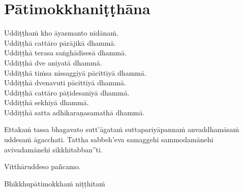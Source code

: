 \section{Pātimokkhaniṭṭhāna}
\label{patimokkhanitthana}

Uddiṭṭhaṁ kho āyasmanto nidānaṁ.\\
Uddiṭṭhā cattāro pārājikā dhammā.\\
Uddiṭṭhā terasa saṅghādisesā dhammā.\\
Uddiṭṭhā dve aniyatā dhammā.\\
Uddiṭṭhā tiṁsa nissaggiyā pācittiyā dhammā.\\
Uddiṭṭhā dvenavuti pācittiyā dhammā.\\
Uddiṭṭhā cattāro pāṭidesanīyā dhammā.\\
Uddiṭṭhā sekhiyā dhammā.\\
Uddiṭṭhā satta adhikaraṇasamathā dhammā.


Ettakaṁ tassa bhagavato sutt'āgataṁ suttapariyāpannaṁ anvaddhamāsaṁ uddesaṁ āgacchati. Tattha sabbeh'eva samaggehi sammodamānehi avivadamānehi sikkhitabban''ti.

Vitthāruddeso pañcamo.

\begin{outro}
  Bhikkhupātimokkhaṁ niṭṭhitaṁ
\end{outro}

\clearpage
